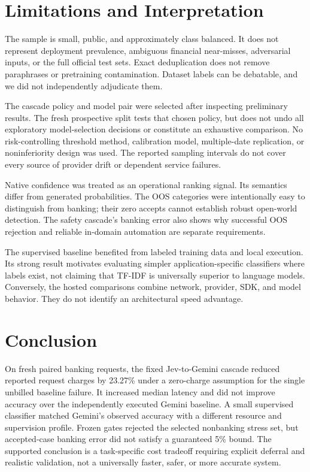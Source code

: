 \documentclass[conference]{IEEEtran}
\begin{document}
\section{Limitations and Interpretation}
The sample is small, public, and approximately class balanced. It does not represent deployment prevalence, ambiguous financial near-misses, adversarial inputs, or the full official test sets. Exact deduplication does not remove paraphrases or pretraining contamination. Dataset labels can be debatable, and we did not independently adjudicate them.

The cascade policy and model pair were selected after inspecting preliminary results. The fresh prospective split tests that chosen policy, but does not undo all exploratory model-selection decisions or constitute an exhaustive comparison. No risk-controlling threshold method, calibration model, multiple-date replication, or noninferiority design was used. The reported sampling intervals do not cover every source of provider drift or dependent service failures.

Native confidence was treated as an operational ranking signal. Its semantics differ from generated probabilities. The OOS categories were intentionally easy to distinguish from banking; their zero accepts cannot establish robust open-world detection. The safety cascade's banking error also shows why successful OOS rejection and reliable in-domain automation are separate requirements.

The supervised baseline benefited from labeled training data and local execution. Its strong result motivates evaluating simpler application-specific classifiers where labels exist, not claiming that TF-IDF is universally superior to language models. Conversely, the hosted comparisons combine network, provider, SDK, and model behavior. They do not identify an architectural speed advantage.

\section{Conclusion}
On fresh paired banking requests, the fixed Jev-to-Gemini cascade reduced reported request charges by 23.27\% under a zero-charge assumption for the single unbilled baseline failure. It increased median latency and did not improve accuracy over the independently executed Gemini baseline. A small supervised classifier matched Gemini's observed accuracy with a different resource and supervision profile. Frozen gates rejected the selected nonbanking stress set, but accepted-case banking error did not satisfy a guaranteed 5\% bound. The supported conclusion is a task-specific cost tradeoff requiring explicit deferral and realistic validation, not a universally faster, safer, or more accurate system.
\end{document}

